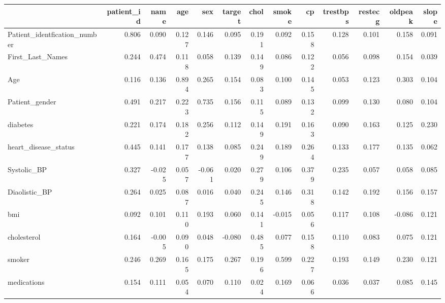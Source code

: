 \begin{tabular}{lrrrrrrrrrrrr}
\toprule
 & patient_id & name & age & sex & target & chol & smoke & cp & trestbps & restecg & oldpeak & slope \\
\midrule
Patient_identfication_number & 0.806 & 0.090 & 0.127 & 0.146 & 0.095 & 0.191 & 0.092 & 0.158 & 0.128 & 0.101 & 0.158 & 0.091 \\
First_Last_Names & 0.244 & 0.474 & 0.118 & 0.058 & 0.139 & 0.149 & 0.086 & 0.122 & 0.056 & 0.098 & 0.154 & 0.039 \\
Age & 0.116 & 0.136 & 0.894 & 0.265 & 0.154 & 0.083 & 0.100 & 0.145 & 0.053 & 0.123 & 0.303 & 0.104 \\
Patient_gender & 0.491 & 0.217 & 0.223 & 0.735 & 0.156 & 0.115 & 0.089 & 0.132 & 0.099 & 0.130 & 0.080 & 0.104 \\
diabetes & 0.221 & 0.174 & 0.182 & 0.256 & 0.112 & 0.149 & 0.191 & 0.163 & 0.090 & 0.163 & 0.125 & 0.230 \\
heart_disease_status & 0.445 & 0.141 & 0.177 & 0.138 & 0.085 & 0.249 & 0.189 & 0.264 & 0.133 & 0.177 & 0.135 & 0.062 \\
Systolic_BP & 0.327 & -0.025 & 0.057 & -0.061 & 0.020 & 0.279 & 0.106 & 0.379 & 0.235 & 0.057 & 0.058 & 0.085 \\
Diaolistic_BP & 0.264 & 0.025 & 0.087 & 0.016 & 0.040 & 0.245 & 0.146 & 0.318 & 0.142 & 0.192 & 0.156 & 0.157 \\
bmi & 0.092 & 0.101 & 0.110 & 0.193 & 0.060 & 0.141 & -0.015 & 0.056 & 0.117 & 0.108 & -0.086 & 0.121 \\
cholesterol & 0.164 & -0.005 & 0.090 & 0.048 & -0.080 & 0.485 & 0.077 & 0.158 & 0.110 & 0.083 & 0.075 & 0.121 \\
smoker & 0.246 & 0.269 & 0.165 & 0.175 & 0.267 & 0.196 & 0.599 & 0.227 & 0.193 & 0.149 & 0.230 & 0.121 \\
medications & 0.154 & 0.111 & 0.054 & 0.070 & 0.110 & 0.024 & 0.169 & 0.066 & 0.036 & 0.037 & 0.085 & 0.145 \\
\bottomrule
\end{tabular}
